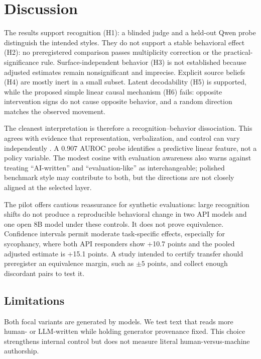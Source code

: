 \section{Discussion}
\label{sec:discussion}

The results support recognition (H1): a blinded judge and a held-out Qwen probe distinguish the intended styles. They do not support a stable behavioral effect (H2): no preregistered comparison passes multiplicity correction or the practical-significance rule. Surface-independent behavior (H3) is not established because adjusted estimates remain nonsignificant and imprecise. Explicit source beliefs (H4) are mostly inert in a small subset. Latent decodability (H5) is supported, while the proposed simple linear causal mechanism (H6) fails: opposite intervention signs do not cause opposite behavior, and a random direction matches the observed movement.

The cleanest interpretation is therefore a recognition--behavior dissociation. This agrees with evidence that representation, verbalization, and control can vary independently \citep{heidari2026representation,nayan2026capability}. A 0.907 AUROC probe identifies a predictive linear feature, not a policy variable. The modest cosine with evaluation awareness also warns against treating ``AI-written'' and ``evaluation-like'' as interchangeable; polished benchmark style may contribute to both, but the directions are not closely aligned at the selected layer.

The pilot offers cautious reassurance for synthetic evaluations: large recognition shifts do not produce a reproducible behavioral change in two API models and one open 8B model under these controls. It does not prove equivalence. Confidence intervals permit moderate task-specific effects, especially for sycophancy, where both API responders show +10.7 points and the pooled adjusted estimate is +15.1 points. A study intended to certify transfer should preregister an equivalence margin, such as $\pm5$ points, and collect enough discordant pairs to test it.

\subsection{Limitations}

Both focal variants are generated by models. We test text that reads more human- or LLM-written while holding generator provenance fixed. This choice strengthens internal control but does not measure literal human-versus-machine authorship.

